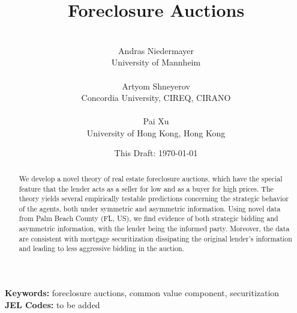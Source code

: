 \documentclass[11pt,twopage]{article}
\begin{document}
\title{Foreclosure Auctions} \author{
  \\
  Andras Niedermayer\\
  {University of Mannheim}\\
  \\
  Artyom Shneyerov\\
  {Concordia University, CIREQ, CIRANO}\\ \\
  Pai Xu\\
  {University of Hong Kong, Hong Kong} }

\date{This Draft:  \today}

\thispagestyle{empty}
\maketitle

\begin{abstract}

We develop a novel theory of real estate foreclosure auctions, which
have the special feature that the lender acts as a seller for low and
as a buyer for high prices. The theory yields several empirically testable predictions concerning the strategic behavior of the agents, both under symmetric and asymmetric information. Using novel data from Palm Beach County (FL, US), we find evidence of both strategic bidding and asymmetric information, with the lender being the informed party. Moreover, the data are consistent with mortgage securitization dissipating the original lender's information and leading to less aggressive bidding in the auction.
%
\end{abstract}

\setlength{\baselineskip}{1.5\baselineskip}

\noindent \textbf{Keywords: } foreclosure auctions, common value component, securitization \\
\textbf{JEL Codes: } to be added
\end{document}
